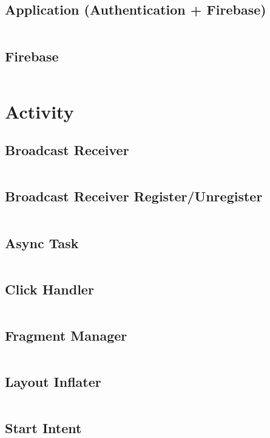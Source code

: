 \documentclass[12pt,a4paper,oneside,ngerman]{scrreprt}
\begin{document}
\subsection{Application (Authentication + Firebase)}
\inputminted[breaklines]{java}{application.java}

\subsection{Firebase}
\inputminted[breaklines]{java}{firebase.java}





\section{Activity}

\subsection{Broadcast Receiver}
\inputminted[breaklines]{java}{bcr.java}

\subsection{Broadcast Receiver Register/Unregister}
\inputminted[breaklines]{java}{bcregister.java}

\subsection{Async Task}
\inputminted[breaklines]{java}{asynctask.java}

\subsection{Click Handler}
\inputminted[breaklines]{java}{onclickhandler.java}

\subsection{Fragment Manager}
\inputminted[breaklines]{java}{fragmentmanager.java}

\subsection{Layout Inflater}
\inputminted[breaklines]{java}{layoutinflater.java}

\subsection{Start Intent}
\inputminted[breaklines]{java}{startintent.java}
\end{document}

